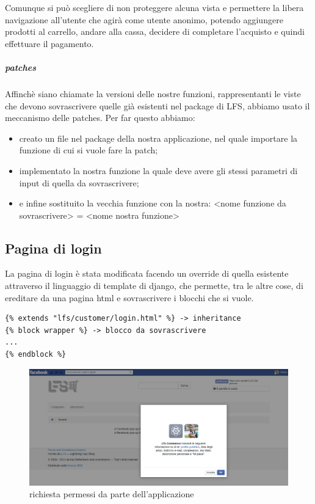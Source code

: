 Comunque si può scegliere di non proteggere alcuna vista e permettere la libera navigazione all'utente che agirà come utente anonimo, potendo aggiungere prodotti al carrello, andare alla cassa, decidere di completare l'acquisto e quindi effettuare il pagamento.

\subparagraph{patches}\label{patches}
Affinchè siano chiamate la versioni delle nostre funzioni, rappresentanti le viste che devono sovrascrivere quelle già esistenti nel package di LFS, abbiamo usato il meccanismo delle patches.
Per far questo abbiamo:
\begin{itemize}
\item creato un file nel package della nostra applicazione, nel quale importare la funzione di cui si vuole fare la patch;
\item implementato la nostra funzione la quale deve avere gli stessi parametri di input di quella da sovrascrivere;
\item e infine sostituito la vecchia funzione con la nostra: <nome funzione da sovrascrivere> = <nome nostra funzione>
\end{itemize}

\subsection{Pagina di login}
La pagina di login è stata modificata facendo un override di quella esistente attraverso il linguaggio di template di django, che permette, tra le altre cose, di ereditare da una pagina html e sovrascrivere i blocchi che si vuole.


\begin{lstlisting}[language=html]
{% extends "lfs/customer/login.html" %} -> inheritance
{% block wrapper %} -> blocco da sovrascrivere
...
{% endblock %}
\end{lstlisting}

\begin{figure}
\centering
\includegraphics[width=0.9\columnwidth]{img/richiesta_permessi}
\caption{richiesta permessi da parte dell'applicazione}
\end{figure}


